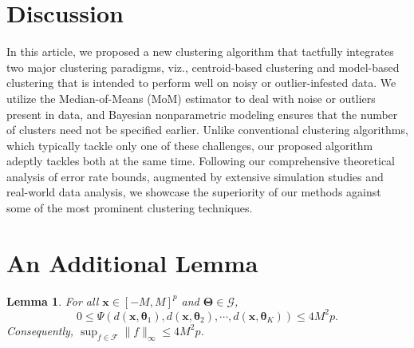 \documentclass{article}
\newtheorem{lemma}{Lemma}[section]
\begin{document}
\section{Discussion}

In this article, we proposed a new clustering algorithm that tactfully integrates two major clustering paradigms, viz., centroid-based clustering and model-based clustering that is intended to perform well on noisy or outlier-infested data. We utilize the Median-of-Means (MoM) estimator to deal with noise or outliers present in data, and Bayesian nonparametric modeling ensures that the number of clusters need not be specified earlier. Unlike conventional clustering algorithms, which typically tackle only one of these challenges, our proposed algorithm adeptly tackles both at the same time. Following our comprehensive theoretical analysis of error rate bounds, augmented by extensive simulation studies and real-world data analysis, we showcase the superiority of our methods against some of the most prominent clustering techniques. 







\appendix




\section{An Additional Lemma}

\begin{lemma}\label{lemma-bound-Psi}
    For all $\bm{x}\in [-M,M]^p$ and $\bm{\Theta}\in \mathscr{G}$, \[0\le \Psi(d(\bm{x},\bm{\theta}_1), d(\bm{x},\bm{\theta}_2),\cdots, d(\bm{x},\bm{\theta}_K) )\le 4M^2p.\]
    Consequently, $\sup_{f\in \mathcal{F}}\|f\|_{\infty}\le 4M^2p$. 
\end{lemma}
\end{document}
